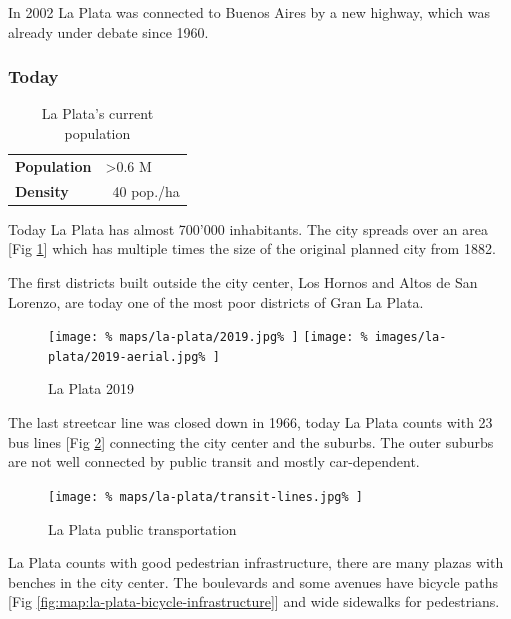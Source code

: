 \documentclass{article}
\begin{document}
\begin{multicols}{2}
			In 2002 La Plata was connected to Buenos Aires by a new highway, which was already under debate since 1960.		
			
			
			\newpage
			\subsubsection{Today}
			
			\begin{table}[H]			
				\centering
				\caption{La Plata's current population}
				\label{table:la-plata-population}
				\begin{tabular}{|l|l|}
					\hline
					\textbf{Population} & \textgreater 0.6 M \\
					\textbf{Density}    & ~40 pop./ha \\
					\hline
				\end{tabular}
			\end{table}
			
			Today La Plata has almost 700'000 inhabitants. The city spreads over an area [Fig \ref{fig:map:la-plata-2019}] which has multiple times the size of the original planned city from 1882.
						
			The first districts built outside the city center, Los Hornos and Altos de San Lorenzo, are today one of the most poor districts of Gran La Plata.
			
			\begin{figure}[H]
				\texttt{[image: \%
					maps/la-plata/2019.jpg\%
				]}
				\texttt{[image: \%
					images/la-plata/2019-aerial.jpg\%
				]}
				\caption{La Plata 2019 \cite{OpenStreetMap:LaPlata}}
				\label{fig:map:la-plata-2019}
			\end{figure}

			The last streetcar line was closed down in 1966, today La Plata counts with 23 bus lines [Fig \ref{fig:map:la-plata-transit}] connecting the city center and the suburbs.
			The outer suburbs are not well connected by public transit and mostly car-dependent.
			
			\begin{figure}[H]
				\texttt{[image: \%
					maps/la-plata/transit-lines.jpg\%
				]}
				\caption{La Plata public transportation  \cite{OpenStreetMap:LaPlata}}
				\label{fig:map:la-plata-transit}
			\end{figure}
			
			La Plata counts with good pedestrian infrastructure, there are many plazas with benches in the city center. The boulevards and some avenues have bicycle paths [Fig \ref{fig:map:la-plata-bicycle-infrastructure}] and wide sidewalks for pedestrians.
			

\end{multicols}
\end{document}
